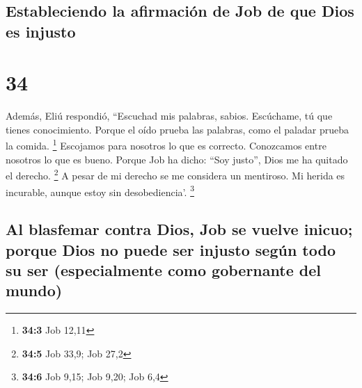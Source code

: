 \hypertarget{estableciendo-la-afirmaciuxf3n-de-job-de-que-dios-es-injusto}{%
\subsection{Estableciendo la afirmación de Job de que Dios es
injusto}\label{estableciendo-la-afirmaciuxf3n-de-job-de-que-dios-es-injusto}}

\hypertarget{section-33}{%
\section{34}\label{section-33}}

 Además, Eliú respondió,  ``Escuchad mis
palabras, sabios. Escúchame, tú que tienes conocimiento. 
Porque el oído prueba las palabras, como el paladar prueba la comida.
\footnote{\textbf{34:3} Job 12,11}  Escojamos para
nosotros lo que es correcto. Conozcamos entre nosotros lo que es bueno.
 Porque Job ha dicho: ``Soy justo'', Dios me ha quitado el
derecho. \footnote{\textbf{34:5} Job 33,9; Job 27,2}  A
pesar de mi derecho se me considera un mentiroso. Mi herida es
incurable, aunque estoy sin desobediencia'. \footnote{\textbf{34:6} Job
  9,15; Job 9,20; Job 6,4}

\hypertarget{al-blasfemar-contra-dios-job-se-vuelve-inicuo-porque-dios-no-puede-ser-injusto-seguxfan-todo-su-ser-especialmente-como-gobernante-del-mundo}{%
\subsection{Al blasfemar contra Dios, Job se vuelve inicuo; porque Dios
no puede ser injusto según todo su ser (especialmente como gobernante
del
mundo)}\label{al-blasfemar-contra-dios-job-se-vuelve-inicuo-porque-dios-no-puede-ser-injusto-seguxfan-todo-su-ser-especialmente-como-gobernante-del-mundo}}

